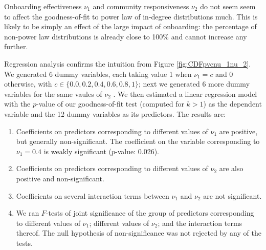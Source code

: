 \documentclass{bmcart}
\def\texttt{[image: ]}
\begin{document}
%

Onboarding effectiveness $\nu_1$ and community responsiveness $\nu_2$ do not seem seem to affect the goodness-of-fit to power law of in-degree distributions much. This is likely to be simply an effect of the large impact of onboarding: the percentage of non-power law distributions is already close to 100\% and cannot increase any further.

Regression analysis confirms the intuition from Figure \ref{fig:CDFpvcnu_1nu_2}. We generated 6 dummy variables, each taking value 1 when $\nu_1 =  c$ and 0 otherwise, with $c \in \{0.0, 0.2, 0.4, 0.6, 0.8, 1\}$; next we generated 6 more dummy variables for the same vaules of $\nu_2$ . We then estimated a linear regression model with the $p$-value of our goodness-of-fit test (computed for $k >1$) as the dependent variable and the 12 dummy variables as its predictors. The results are:

\begin{enumerate}
\item Coefficients on predictors corresponding to different values of $\nu_1$ are positive, but generally non-significant. The coefficient on the variable corresponding to $\nu_1 = 0.4$ is weakly significant ($p$-value: 0.026).
\item Coefficients on predictors corresponding to different values of $\nu_2$ are also  positive and non-significant. 
\item Coefficients on several interaction terms between $\nu_1$ and $\nu_2$ are not significant. 
\item We ran $F$-tests of joint significance of the group of predictors corresponding to different values of $\nu_1$; different values of $\nu_2$; and the interaction terms thereof. The null hypothesis of non-significance was not rejected by any of the tests. 
\end{enumerate}
\end{document}
